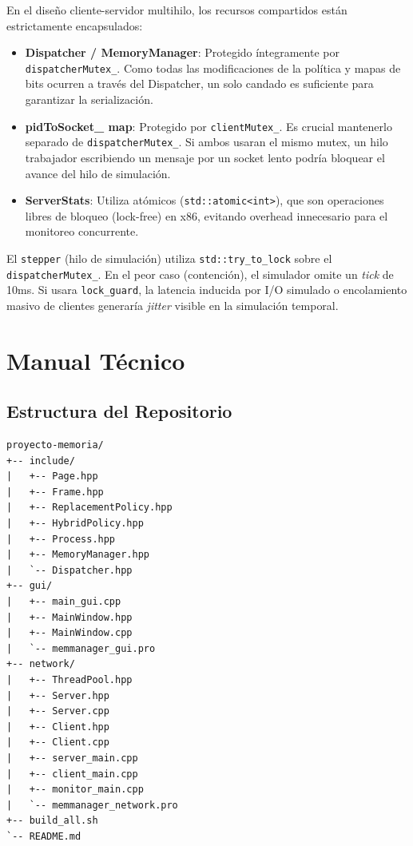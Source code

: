 \documentclass[12pt,letterpaper]{article}
\begin{document}
En el diseño cliente-servidor multihilo, los recursos compartidos están estrictamente encapsulados:
\begin{itemize}
    \item \textbf{Dispatcher / MemoryManager}: Protegido íntegramente por \texttt{dispatcherMutex\_}.
Como todas las modificaciones de la política y mapas de bits ocurren a través del Dispatcher, un solo candado es suficiente para garantizar la serialización.
\item \textbf{pidToSocket\_ map}: Protegido por \texttt{clientMutex\_}. Es crucial mantenerlo separado de \texttt{dispatcherMutex\_}.
Si ambos usaran el mismo mutex, un hilo trabajador escribiendo un mensaje por un socket lento podría bloquear el avance del hilo de simulación.
\item \textbf{ServerStats}: Utiliza atómicos (\texttt{std::atomic<int>}), que son operaciones libres de bloqueo (lock-free) en x86, evitando overhead innecesario para el monitoreo concurrente.
\end{itemize}

El \texttt{stepper} (hilo de simulación) utiliza \texttt{std::try\_to\_lock} sobre el \texttt{dispatcherMutex\_}.
En el peor caso (contención), el simulador omite un \textit{tick} de 10ms.
Si usara \texttt{lock\_guard}, la latencia inducida por I/O simulado o encolamiento masivo de clientes generaría \textit{jitter} visible en la simulación temporal.
\newpage
\section{Manual Técnico}

\subsection{Estructura del Repositorio}

\begin{tcolorbox}[terminalbox, title={Árbol de Directorios del Proyecto}]
\begin{verbatim}
proyecto-memoria/
+-- include/
|   +-- Page.hpp
|   +-- Frame.hpp
|   +-- ReplacementPolicy.hpp
|   +-- HybridPolicy.hpp
|   +-- Process.hpp
|   +-- MemoryManager.hpp
|   `-- Dispatcher.hpp
+-- gui/
|   +-- main_gui.cpp
|   +-- MainWindow.hpp
|   +-- MainWindow.cpp
|   `-- memmanager_gui.pro
+-- network/
|   +-- ThreadPool.hpp
|   +-- Server.hpp
|   +-- Server.cpp
|   +-- Client.hpp
|   +-- Client.cpp
|   +-- server_main.cpp
|   +-- client_main.cpp
|   +-- monitor_main.cpp
|   `-- memmanager_network.pro
+-- build_all.sh
`-- README.md
\end{verbatim}
\end{tcolorbox}
\end{document}
